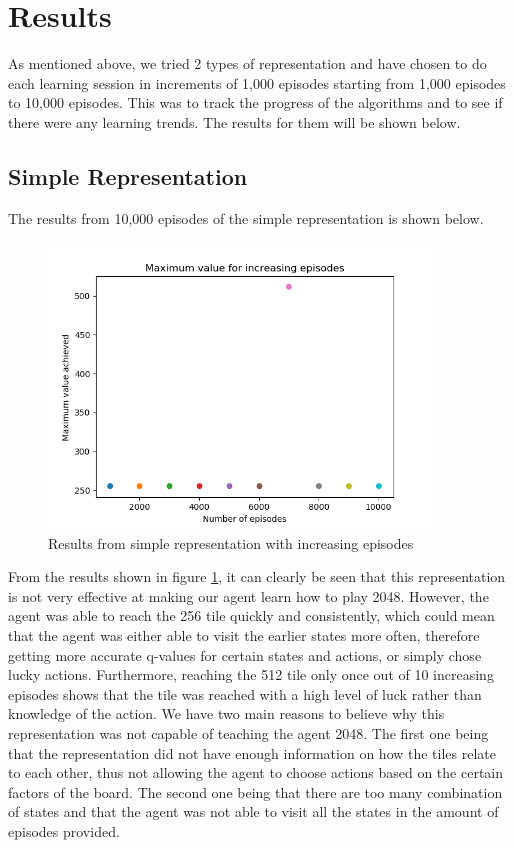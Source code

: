 \section{Results}
As mentioned above, we tried 2 types of representation and have chosen to do each learning session in increments of 1,000 episodes starting from 1,000 episodes to 10,000 episodes. This was to track the progress of the algorithms and to see if there were any learning trends.
The results for them will be shown below. 

\subsection{Simple Representation}
The results from 10,000 episodes of the simple representation is shown below.

\begin{figure}[h]
	\centering
	\includegraphics[width=4.0in]{experiment1}
	\caption{Results from simple representation with increasing episodes}
	\label{fig:experiment1}
\end{figure}

From the results shown in figure \ref{fig:experiment1}, it can clearly be seen that this representation is not very effective at making our agent learn how to play 2048. However, the agent was able to reach the 256 tile quickly and consistently, which could mean that the agent was either able to visit the earlier states more often, therefore getting more accurate q-values for certain states and actions, or simply chose lucky actions. Furthermore, reaching the 512 tile only once out of 10 increasing episodes shows that the tile was reached with a high level of luck rather than knowledge of the action. We have two main reasons to believe why this representation was not capable of teaching the agent 2048. The first one being that the representation did not have enough information on how the tiles relate to each other, thus not allowing the agent to choose actions based on the certain factors of the board. The second one being that there are too many combination of states and that the agent was not able to visit all the states in the amount of episodes provided. 

